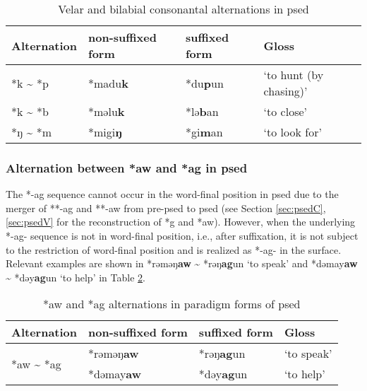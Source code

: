\begin{table}[!htbp]
\centering
\caption{Velar and bilabial consonantal alternations in \acl{psed}}
\label{tab:psed_lab_vel}
\begin{tabular}{llll}
\hline
Alternation & non-suffixed form & suffixed form & Gloss                  \\ \hline
*k \~{ } *p     & *madu\textbf{k}  & *du\textbf{p}un       & `to hunt (by chasing)' \\
*k \~{ } *b     & *məlu\textbf{k}  & *lə\textbf{b}an       & `to close'             \\
*ŋ \~{ } *m     & *migi\textbf{ŋ}  & *gi\textbf{m}an       & `to look for'          \\ \hline
\end{tabular}
\end{table}

\subsubsection{Alternation between *aw and *ag in \acl{psed}}

The *-ag sequence cannot occur in the word-final position in \acl{psed} due to the merger of **-ag and **-aw from pre-\acl{psed} to \acl{psed}  (see Section \ref{sec:psedC}, \ref{sec:psedV} for the reconstruction of *g and *aw). However, when the underlying *-ag- sequence is not in word-final position, i.e., after suffixation, it is not subject to the restriction of word-final position and is realized as *-ag- in the surface. Relevant examples are shown in *rəməŋ\textbf{aw} \~{} *rəŋ\textbf{ag}un `to speak' and  *dəmay\textbf{aw} \~{} *dəy\textbf{ag}un `to help' in Table \ref{tab:psed_agaw}.

\begin{table}[!htbp]
\centering
\caption{*aw and *ag alternations in paradigm forms of \acl{psed}}
\label{tab:psed_agaw}
\begin{tabular}{llll}
\hline
Alternation                      & non-suffixed form  & suffixed form & Gloss                   \\ \hline
\multirow{2}{*}{*aw \~{ } *ag}  & *rəməŋ\textbf{aw} & *rəŋ\textbf{ag}un     & `to speak'               \\
                                & *dəmay\textbf{aw} & *dəy\textbf{ag}un     & `to help' \\ \hline
\end{tabular}
\end{table}

